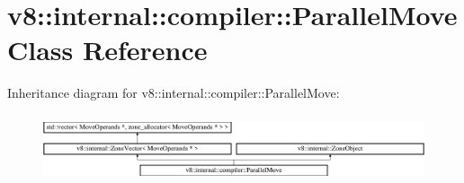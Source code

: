 \hypertarget{classv8_1_1internal_1_1compiler_1_1_parallel_move}{}\section{v8\+:\+:internal\+:\+:compiler\+:\+:Parallel\+Move Class Reference}
\label{classv8_1_1internal_1_1compiler_1_1_parallel_move}
Inheritance diagram for v8\+:\+:internal\+:\+:compiler\+:\+:Parallel\+Move\+:\begin{figure}[H]
\begin{center}
\leavevmode
\includegraphics[height=2.009569cm]{classv8_1_1internal_1_1compiler_1_1_parallel_move}
\end{center}
\end{figure}
